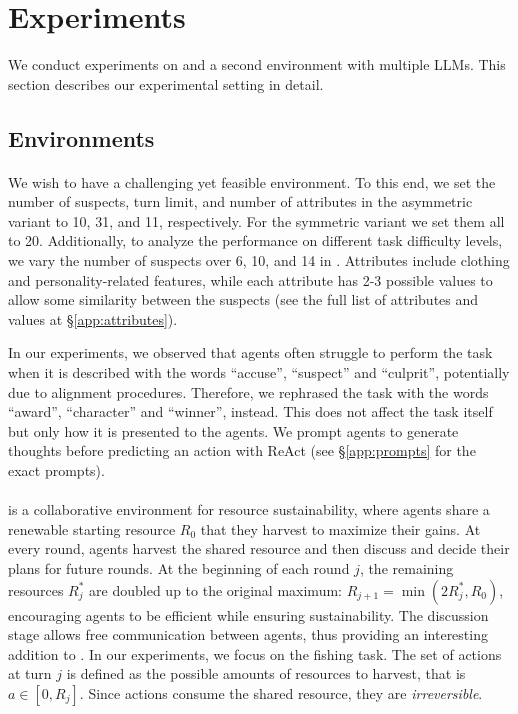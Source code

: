 
\section{Experiments}
\label{sec:experimental_setting}

We conduct experiments on \ourenv{} and a second environment with multiple LLMs. This section describes our experimental setting in detail.


\subsection{Environments}

\paragraph{\ourenv{}}
We wish to have a challenging yet feasible environment. To this end, we set the number of suspects, turn limit, and number of attributes in the asymmetric variant to 10, 31, and 11, respectively. For the symmetric variant we set them all to 20.
Additionally, to analyze the performance on different task difficulty levels, we vary the number of suspects over 6, 10, and 14 in \ourenvasym{}.
Attributes include clothing and personality-related features, while each attribute has 2-3 possible values to allow some similarity between the suspects (see the full list of attributes and values at \S\ref{app:attributes}).

In our experiments, we observed that agents often struggle to perform the task when it is described with the words ``accuse'', ``suspect'' and ``culprit'', potentially due to alignment procedures. Therefore, we rephrased the task with the words ``award'', ``character'' and ``winner'', instead. This does not affect the task itself but only how it is presented to the agents.
We prompt agents to generate thoughts before predicting an action with ReAct \cite{yao2023react} (see \S\ref{app:prompts} for the exact prompts).


\paragraph{\govsim{}} \cite{piatti2024cooperate} is a collaborative environment for resource sustainability, where agents share a renewable starting resource $R_0$ that they harvest to maximize their gains. At every round, agents harvest the shared resource and then discuss and decide their plans for future rounds. At the beginning of each round $j$, the remaining resources $R^*_j$ are doubled up to the original maximum: $R_{j+1} = \min(2R^*_j, R_0)$, encouraging agents to be efficient while ensuring sustainability. The discussion stage allows free communication between agents, thus providing an interesting addition to \ourenv{}. 
In our experiments, we focus on the fishing task. The set of actions at turn $j$ is defined as the possible amounts of resources to harvest, that is $a\in[0, R_j]$.
Since actions consume the shared resource, they are \emph{irreversible}.

